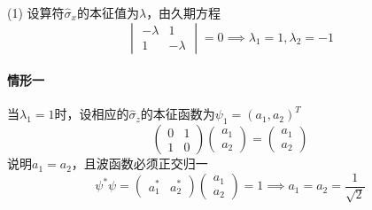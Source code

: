 \begin{solution}
    (1) 设算符$\hat{\sigma}_x$的本征值为$\lambda$，由久期方程
    $$
        \begin{vmatrix}
            -\lambda & 1        \\
            1        & -\lambda
        \end{vmatrix}=0
        \implies
        \lambda_1=1, \lambda_2=-1
    $$
    \paragraph{情形一} 当$\lambda_1=1$时，设相应的$\hat{\sigma}_z$的本征函数为$\psi_1=(a_1, a_2)^T$
    $$
        \begin{pmatrix}
            0 & 1 \\
            1 & 0
        \end{pmatrix}\begin{pmatrix}
            a_1 \\
            a_2
        \end{pmatrix} = \begin{pmatrix}
            a_1 \\
            a_2
        \end{pmatrix}
    $$
    说明$a_1=a_2$，且波函数必须正交归一
    $$
        \psi^*\psi
        =\begin{pmatrix}
            a_1^* & a_2^*
        \end{pmatrix}\begin{pmatrix}
            a_1 \\
            a_2
        \end{pmatrix}
        =1 \implies a_1=a_2=\frac{1}{\sqrt{2}}
    $$

\end{solution}
